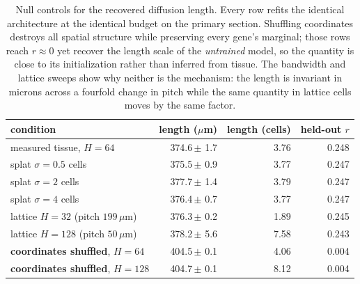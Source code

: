 \begin{table}[htbp]
\centering
\small
\caption{Null controls for the recovered diffusion length. Every row refits the identical architecture at the identical budget on the primary section. Shuffling coordinates destroys all spatial structure while preserving every gene's marginal; those rows reach $r \approx 0$ yet recover the length scale of the \emph{untrained} model, so the quantity is close to its initialization rather than inferred from tissue. The bandwidth and lattice sweeps show why neither is the mechanism: the length is invariant in microns across a fourfold change in pitch while the same quantity in lattice cells moves by the same factor.}
\label{tab:difflen_null}
\begin{tabular}{lrrr}
\toprule
condition & length ($\mu$m) & length (cells) & held-out $r$\\
\midrule
measured tissue, $H{=}64$ & 374.6\,\tiny{$\pm$ 1.7} & 3.76 & 0.248 \\
splat $\sigma = 0.5$ cells & 375.5\,\tiny{$\pm$ 0.9} & 3.77 & 0.247 \\
splat $\sigma = 2$ cells & 377.7\,\tiny{$\pm$ 1.4} & 3.79 & 0.247 \\
splat $\sigma = 4$ cells & 376.4\,\tiny{$\pm$ 0.7} & 3.77 & 0.247 \\
lattice $H{=}32$ (pitch $199\,\mu$m) & 376.3\,\tiny{$\pm$ 0.2} & 1.89 & 0.245 \\
lattice $H{=}128$ (pitch $50\,\mu$m) & 378.2\,\tiny{$\pm$ 5.6} & 7.58 & 0.243 \\
\midrule
\textbf{coordinates shuffled}, $H{=}64$ & 404.5\,\tiny{$\pm$ 0.1} & 4.06 & 0.004 \\
\textbf{coordinates shuffled}, $H{=}128$ & 404.7\,\tiny{$\pm$ 0.1} & 8.12 & 0.004 \\
\bottomrule
\end{tabular}
\end{table}
